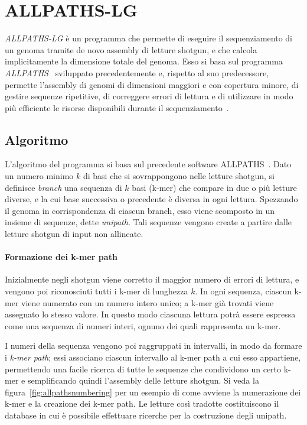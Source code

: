 \documentclass[crop=false, class=book]{standalone}
\begin{document}
	
	
	\section{ALLPATHS-LG}
	\textit{ALLPATHS-LG} è un programma che permette di eseguire il sequenziamento di un genoma tramite de novo assembly di letture shotgun, e che calcola implicitamente la dimensione totale del genoma. Esso si basa sul programma \textit{ALLPATHS}~\cite{butler2008allpaths,maccallum2009allpaths2} sviluppato precedentemente e, rispetto al suo predecessore, permette l'assembly di genomi di dimensioni maggiori e con copertura minore, di gestire sequenze ripetitive, di correggere errori di lettura e di utilizzare in modo più efficiente le risorse disponibili durante il sequenziamento~\cite{gnerre2011high}. 
	
	
	\subsection{Algoritmo}
	L'algoritmo del programma si basa sul precedente software ALLPATHS~\cite{butler2008allpaths}. Dato un numero minimo $k$ di basi che si sovrappongono nelle letture shotgun, si definisce \textit{branch} una sequenza di $k$ basi (k-mer) che compare in due o più letture diverse, e la cui base successiva o precedente è diversa in ogni lettura. Spezzando il genoma in corrispondenza di ciascun branch, esso viene scomposto in un insieme di sequenze, dette \textit{unipath}. Tali sequenze vengono create a partire dalle letture shotgun di input non allineate. 
	
	\paragraph{Formazione dei k-mer path}
	Inizialmente negli shotgun viene corretto il maggior numero di errori di lettura, e vengono poi riconosciuti tutti i k-mer di lunghezza $k$. In ogni sequenza, ciascun k-mer viene numerato con un numero intero unico; a k-mer già trovati viene assegnato lo stesso valore. In questo modo ciascuna lettura potrà essere espressa come una sequenza di numeri interi, ognuno dei quali rappresenta un k-mer. 
	
	I numeri della sequenza vengono poi raggruppati in intervalli, in modo da formare i \textit{k-mer path}; essi associano ciascun intervallo al k-mer path a cui esso appartiene, permettendo una facile ricerca di tutte le sequenze che condividono un certo k-mer e semplificando quindi l'assembly delle letture shotgun. Si veda la figura~\vref{fig:allpathsnumbering} per un esempio di come avviene la numerazione dei k-mer e la creazione dei k-mer path.
	Le letture così tradotte costituiscono il database in cui è possibile effettuare ricerche per la costruzione degli unipath.
	
\end{document}
